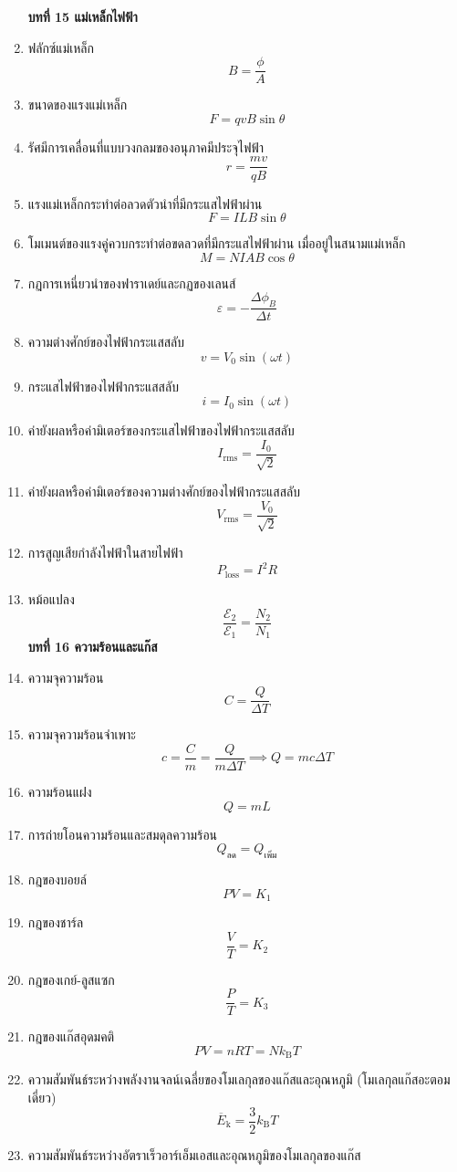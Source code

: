 \documentclass[12pt, a4paper]{article}
\begin{document}
\begin{enumerate}
\begin{center}
	\end{center}
	\textbf{บทที่ 15 แม่เหล็กไฟฟ้า}
	\item ฟลักซ์แม่เหล็ก
		\[B=\frac{\phi}{A}\]
	\item ขนาดของแรงแม่เหล็ก
		\[F=qvB\sin\theta\]
	\item รัศมีการเคลื่อนที่แบบวงกลมของอนุภาคมีประจุไฟฟ้า
		\[r=\frac{mv}{qB}\]
	\item แรงแม่เหล็กกระทำต่อลวดตัวนำที่มีกระแสไฟฟ้าผ่าน
		\[F=ILB\sin\theta\]
	\item โมเมนต์ของแรงคู่ควบกระทำต่อขดลวดที่มีกระแสไฟฟ้าผ่าน เมื่ออยู่ในสนามแม่เหล็ก
		\[M=NIAB\cos\theta\]
	\item กฏการเหนี่ยวนำของฟาราเดย์และกฏของเลนส์
		\[\varepsilon=-\frac{\Delta \phi_B}{\Delta t}\]
	\item ความต่างศักย์ของไฟฟ้ากระแสสลับ
		\[v=V_0\sin(\omega t)\]
	\item กระแสไฟฟ้าของไฟฟ้ากระแสสลับ
		\[i=I_0\sin(\omega t)\]
	\item ค่ายังผลหรือค่ามิเตอร์ของกระแสไฟฟ้าของไฟฟ้ากระแสสลับ
		\[I_\text{rms}=\frac{I_0}{\sqrt{2}}\]
	\item ค่ายังผลหรือค่ามิเตอร์ของความต่างศักย์ของไฟฟ้ากระแสสลับ
		\[V_\text{rms}=\frac{V_0}{\sqrt{2}}\]
	\item การสูญเสียกำลังไฟฟ้าในสายไฟฟ้า
		\[P_\text{loss}=I^2R\]
	\item หม้อแปลง
		\[\frac{\mathcal{E}_2}{\mathcal{E}_1}=\frac{N_2}{N_1}\]
	\textbf{บทที่ 16 ความร้อนและแก๊ส}
	\item ความจุความร้อน
		\[C=\frac{Q}{\Delta T}\]
	\item ความจุความร้อนจำเพาะ
		\[c=\frac{C}{m}=\frac{Q}{m\Delta T}\implies Q=mc\Delta T\]
	\item ความร้อนแฝง
		\[Q=mL\]
	\item การถ่ายโอนความร้อนและสมดุลความร้อน
		\[Q_\text{ลด}=Q_\text{เพิ่ม}\]
	\item กฎของบอยล์
		\[PV=K_1\]
	\item กฎของชาร์ล
		\[\frac{V}{T}=K_2\]
	\item กฎของเกย์-ลูสแซก
		\[\frac{P}{T}=K_3\]
	\item กฎของแก๊สอุดมคติ
		\[PV=nRT=Nk_\text{B}T\]
	\item ความสัมพันธ์ระหว่างพลังงานจลน์เฉลี่ยของโมเลกุลของแก๊สและอุณหภูมิ (โมเลกุลแก๊สอะตอมเดี่ยว\textenglish{)}
		\[\overbar{E}_\text{k}=\frac{3}{2}k_\text{B}T\]
	\item ความสัมพันธ์ระหว่างอัตราเร็วอาร์เอ็มเอสและอุณหภูมิของโมเลกุลของแก๊ส

\end{enumerate}
\end{document}
